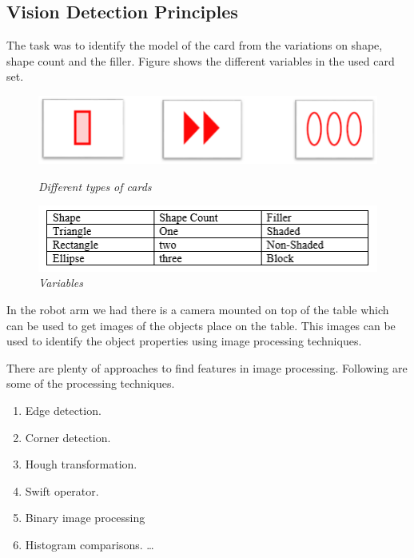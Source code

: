 \subsection{Vision Detection Principles}

The task was to identify the model of the card from the variations on shape, shape count and the filler. Figure shows the different variables in the used card set.

	\begin{figure}[position = here]
		\begin{centering}
			\includegraphics[scale=0.5]{./sachiths_images/image123.png}\\
			\caption[]{\textit{Different types of cards}}
		\end{centering}
	\end{figure}
	\begin{figure}
		\centering
		\includegraphics[scale=0.8]{./sachiths_images/image2.png}
		\caption[]{\textit{Variables}}
	\end{figure}

In the robot arm we had there is a camera mounted on top of the table which can be used to get images of the objects place on the table. This images can be used to identify the object properties using image processing techniques. 

There are plenty of approaches to find features in image processing. Following are some of the processing techniques.


\begin{enumerate}
	\item Edge detection.
	\item Corner detection.
	\item Hough transformation.
	\item Swift operator.
	\item Binary image processing
	\item Histogram comparisons. \ldots
\end{enumerate}

